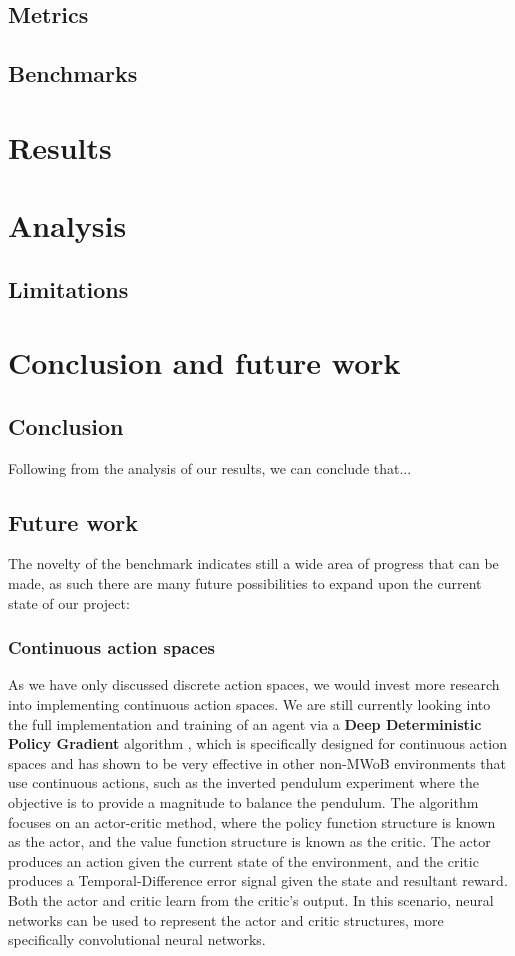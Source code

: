 \documentclass[conference]{IEEEtran}
\begin{document}
\subsection{Metrics}

\subsection{Benchmarks}

\section{Results}

\section{Analysis}

\subsection{Limitations}

\section{Conclusion and future work}
\subsection{Conclusion}
Following from the analysis of our results, we can conclude that...
\subsection{Future work}
The novelty of the benchmark indicates still a wide area of progress that can be made, as such there are many future possibilities to expand upon the current state of our project:
\subsubsection{Continuous action spaces}
As we have only discussed discrete action spaces, we would invest more research into implementing continuous action spaces. We are still currently looking into the full implementation and training of an agent via a \textbf{Deep Deterministic Policy Gradient} algorithm \cite{lillicrap2015continuous}, which is specifically designed for continuous action spaces and has shown to be very effective in other non-MWoB environments that use continuous actions, such as the inverted pendulum experiment \cite{pendulum} where the objective is to provide a magnitude to balance the pendulum. The algorithm focuses on an actor-critic method, where the policy function structure is known as the actor, and the value function structure is known as the critic. The actor produces an action given the current state of the environment, and the critic produces a Temporal-Difference error signal given the state and resultant reward. Both the actor and critic learn from the critic's output. In this scenario, neural networks can be used to represent the actor and critic structures, more specifically convolutional neural networks.
\end{document}
